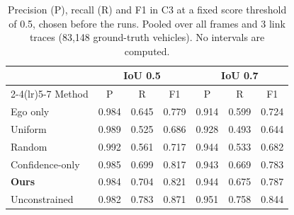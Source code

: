 \begin{table}[t]\caption{Precision (P), recall (R) and F1 in C3 at a fixed score threshold of 0.5, chosen before the runs. Pooled over all frames and 3 link traces (83,148 ground-truth vehicles). No intervals are computed.}\label{tab:pr}
\centering\scriptsize\setlength{\tabcolsep}{3pt}\begin{tabular}{lcccccc}\toprule & \multicolumn{3}{c}{IoU 0.5} & \multicolumn{3}{c}{IoU 0.7}\\\cmidrule(lr){2-4}\cmidrule(lr){5-7}
Method & P & R & F1 & P & R & F1\\\midrule
Ego only & 0.984 & 0.645 & 0.779 & 0.914 & 0.599 & 0.724\\
Uniform & 0.989 & 0.525 & 0.686 & 0.928 & 0.493 & 0.644\\
Random & 0.992 & 0.561 & 0.717 & 0.944 & 0.533 & 0.682\\
Confidence-only & 0.985 & 0.699 & 0.817 & 0.943 & 0.669 & 0.783\\
\textbf{Ours} & 0.984 & 0.704 & 0.821 & 0.944 & 0.675 & 0.787\\
Unconstrained & 0.982 & 0.783 & 0.871 & 0.951 & 0.758 & 0.844\\
\bottomrule\end{tabular}\end{table}
